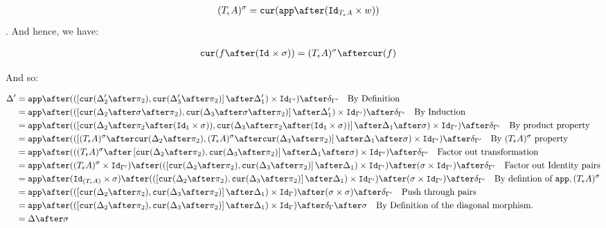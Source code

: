 \documentclass{report}
\begin{document}
\begin{align*}
    (\tea)^{\si} & = \cur{\app\after(\Id{\tea}\times w)}
\end{align*}.
And hence, we have:

\begin{align*}
    \cur{f\after(\Id{}\times \si)} & = (\tea)^{\si} \after\cur{f}
\end{align*}

And so:

\begin{align*}
    \D' & =\app\after((\fld{\cur{\D_2'\after\pp}}{\cur{\D_3'\after\pp}}\after\D_1')\times \Id{\G'})\after\diag{\G'}\qt{By Definition}\\
    & =\app\after((\fld{\cur{\D_2\after\si\after\pp}}{\cur{\D_3\after\si\after\pp}}\after\D_1')\times \Id{\G'})\after\diag{\G'}\qt{By Induction}\\
    & = \app\after((\fld{\cur{\D_2\after\pp\after(\Id{\1}\times \si)}}{\cur{\D_3\after\pp\after(\Id{\1}\times \si)}}\after\D_1\after\si)\times \Id{\G'})\after\diag{\G'}\qt{By product property}\\
    & = \app\after((\fld{(\tea)^{\si}\after\cur{\D_2\after\pp}}{(\tea)^{\si}\after\cur{\D_3\after\pp}}\after\D_1\after\si)\times \Id{\G'})\after\diag{\G'}\qt{By $(\tea)^{\si}$ property}\\
    & = \app\after(((\tea)^{\si}\after\fld{\cur{\D_2\after\pp}}{\cur{\D_3\after\pp}}\after\D_1\after\si)\times \Id{\G'})\after\diag{\G'}\qt{Factor out transformation}\\
    & = \app\after((\tea)^{\si}\times\Id{\G'})\after((\fld{\cur{\D_2\after\pp}}{\cur{\D_3\after\pp}}\after\D_1)\times \Id{\G'})\after(\si \times \Id{\G'})\after\diag{\G'}\qt{Factor out Identity pairs}\\
    & = \app\after(\Id{(\tea)}\times\si)\after((\fld{\cur{\D_2\after\pp}}{\cur{\D_3\after\pp}}\after\D_1) \times \Id{\G'})\after(\si \times \Id{\G'})\after\diag{\G'}\qt{By defintion of $\app, (\tea)^{\si}$}\\
    & = \app\after((\fld{\cur{\D_2\after\pp}}{\cur{\D_3\after\pp}}\after\D_1)\times \idg)\after(\si \times \si)\after\diag{\G'}\qt{Push through pairs}\\
    & = \app\after((\fld{\cur{\D_2\after\pp}}{\cur{\D_3\after\pp}}\after\D_1)\times \idg)\after\diag{\G}\after\si\qt{By Definition of the diagonal morphism.}\\
    & = \D\after\si
\end{align*}


\end{document}
